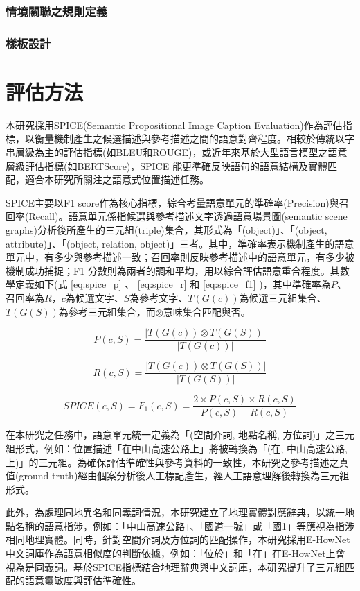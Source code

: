 \subsubsection{情境關聯之規則定義}

\subsubsection{樣板設計}


\section{評估方法}
本研究採用SPICE(Semantic Propositional Image Caption Evaluation)作為評估指標\citep{RN29}，以衡量機制產生之候選描述與參考描述之間的語意對齊程度。相較於傳統以字串層級為主的評估指標(如BLEU和ROUGE)，或近年來基於大型語言模型之語意層級評估指標(如BERTScore)，SPICE 能更準確反映語句的語意結構及實體匹配，適合本研究所關注之語意式位置描述任務。

SPICE主要以F1 score作為核心指標，綜合考量語意單元的準確率(Precision)與召回率(Recall)。語意單元係指候選與參考描述文字透過語意場景圖(semantic scene graphs)分析後所產生的三元組(triple)集合，其形式為「(object)」、「(object, attribute)」、「(object, relation, object)」三者。其中，準確率表示機制產生的語意單元中，有多少與參考描述一致；召回率則反映參考描述中的語意單元，有多少被機制成功捕捉；F1 分數則為兩者的調和平均，用以綜合評估語意重合程度。其數學定義如下(式 \ref{eq:spice_p} 、 \ref{eq:spice_r} 和 \ref{eq:spice_f1} )，其中準確率為$P$、召回率為$R$，$c$為候選文字、$S$為參考文字、$T(G(c))$為候選三元組集合、$T(G(S))$為參考三元組集合，而$\otimes$意味集合匹配與否。

\begin{equation}
\label{eq:spice_p}
P(c,S) = \frac{\left| T(G(c)) \otimes T(G(S)) \right|}{\left| T(G(c)) \right|}
\end{equation}

\begin{equation}
\label{eq:spice_r}
R(c,S) = \frac{\left| T(G(c)) \otimes T(G(S)) \right|}{\left| T(G(S)) \right|}
\end{equation}

\begin{equation}
\label{eq:spice_f1}
SPICE(c,S) = F_1(c,S) = \frac{2 \times P(c,S) \times R(c,S)}{P(c,S) + R(c,S)}
\end{equation}

在本研究之任務中，語意單元統一定義為「(空間介詞, 地點名稱, 方位詞)」之三元組形式，例如：位置描述「在中山高速公路上」將被轉換為「(在, 中山高速公路, 上)」的三元組。為確保評估準確性與參考資料的一致性，本研究之參考描述之真值(ground truth)經由個案分析後人工標記產生，經人工語意理解後轉換為三元組形式。

此外，為處理同地異名和同義詞情況，本研究建立了地理實體對應辭典，以統一地點名稱的語意指涉，例如：「中山高速公路」、「國道一號」或「國1」等應視為指涉相同地理實體。同時，針對空間介詞及方位詞的匹配操作，本研究採用E-HowNet中文詞庫作為語意相似度的判斷依據，例如：「位於」和「在」在E-HowNet上會視為是同義詞。基於SPICE指標結合地理辭典與中文詞庫，本研究提升了三元組匹配的語意靈敏度與評估準確性。


